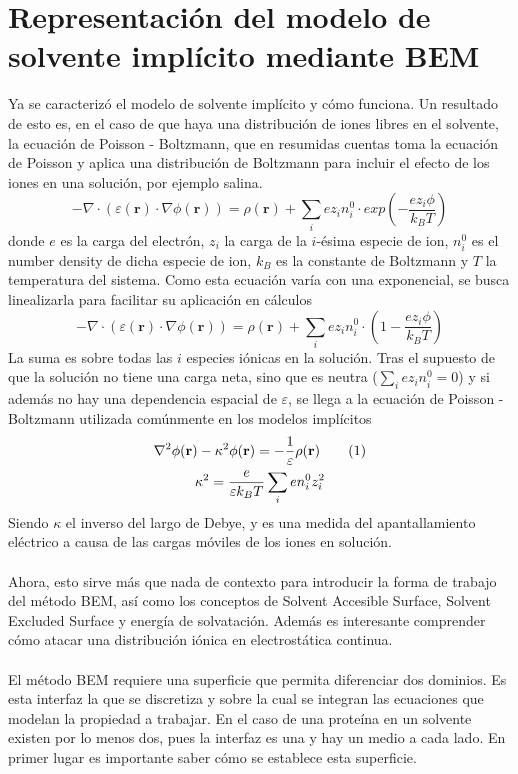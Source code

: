 \documentclass[12pt, oneside, numbers, spanish]{ezthesis}
\newcommand\numberthis{\addtocounter{equation}{1}\tag{\theequation}}
\numberwithin{equation}{section}
\begin{document}
\section{Representación del modelo de solvente implícito mediante BEM}\label{Sec: Implicit_Solvent}
Ya se caracterizó el modelo de solvente implícito y cómo funciona. Un resultado de esto es, en el caso de que haya una distribución de iones libres en el solvente, la ecuación de Poisson - Boltzmann, que en resumidas cuentas toma la ecuación de Poisson y aplica una distribución de Boltzmann para incluir el efecto de los iones en una solución, por ejemplo salina.
\begin{equation}
-\nabla\cdot(\varepsilon(\mathbf{r})\cdot\nabla\phi(\mathbf{r})) = \rho(\mathbf{r}) + \sum_i ez_in_i^0\cdot exp\left(-\frac{ez_i\phi}{k_BT}\right)
\end{equation}
donde $e$ es la carga del electrón, $z_i$ la carga de la $i$-ésima especie de ion, $n_i^0$ es el number density de dicha especie de ion, $k_B$ es la constante de Boltzmann y $T$ la temperatura del sistema. Como esta ecuación varía con una exponencial, se busca linealizarla para facilitar su aplicación en cálculos
\begin{equation}
-\nabla\cdot(\varepsilon(\mathbf{r})\cdot\nabla\phi(\mathbf{r})) = \rho(\mathbf{r}) + \sum_i ez_in_i^0\cdot \left(1 - \frac{ez_i\phi}{k_BT}\right)
\end{equation}
La suma es sobre todas las $i$ especies iónicas en la solución. Tras el supuesto de que la solución no tiene una carga neta, sino que es neutra ($\sum_i ez_in_i^0 = 0$) y si además no hay una dependencia espacial de $\varepsilon$, se llega a la ecuación de Poisson - Boltzmann utilizada comúnmente en los modelos implícitos
\begin{gather*}
\nabla^2\phi(\mathbf{r}) - \kappa^2\phi(\mathbf{r}) = - \frac{1}{\varepsilon}\rho(\mathbf{r})\numberthis \\
\kappa^2 = \frac{e}{\varepsilon k_BT}\sum_i en_i^0z_i^2
\end{gather*}
Siendo $\kappa$ el inverso del largo de Debye, y es una medida del apantallamiento eléctrico a causa de las cargas móviles de los iones en solución.\\\\
Ahora, esto sirve más que nada de contexto para introducir la forma de trabajo del método BEM, así como los conceptos de Solvent Accesible Surface, Solvent Excluded Surface y energía de solvatación. Además es interesante comprender cómo atacar una distribución iónica en electrostática continua.\\\\
El método BEM requiere una superficie que permita diferenciar dos dominios. Es esta interfaz la que se discretiza y sobre la cual se integran las ecuaciones que modelan la propiedad a trabajar. En el caso de una proteína en un solvente existen por lo menos dos, pues la interfaz es una y hay un medio a cada lado. En primer lugar es importante saber cómo se establece esta superficie.
\end{document}
